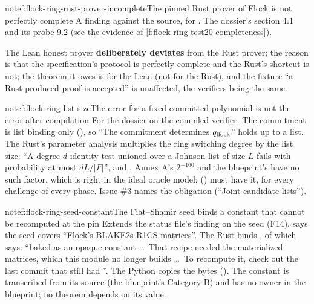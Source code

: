 \begin{finding}{note}{f:flock-ring-rust-prover-incomplete}{The pinned Rust prover of Flock is not
perfectly complete}
 A finding against the source, for . The dossier's
section 4.1 and its probe 9.2 (see the evidence of \cref{f:flock-ring-test20-completeness}).

 The Lean honest prover \textbf{deliberately deviates} from the Rust prover;
the reason is that the specification's protocol is perfectly complete and the Rust's shortcut is
not; the theorem it owes is  for the Lean  (not for the
Rust), and the fixture \enquote{a Rust-produced proof is accepted} is unaffected, the verifiers
being the same.
\end{finding}

\begin{finding}{note}{f:flock-ring-list-size}{The error for a fixed committed polynomial is not
the error after compilation}
 For the dossier on the compiled verifier. The commitment is list binding only
(), so  \enquote{The commitment
determines $q_{\mathrm{flock}}$} holds up to a list. The Rust's parameter analysis multiplies the ring
switching degree by the list size:  \enquote{A degree-$d$ identity
test unioned over a Johnson list of size $L$ fails with probability at most $dL/|F|$}, and
. Annex A's $2^{-160}$ and the blueprint's  have no such factor,
which is right in the ideal oracle model;  () must have it, for
every challenge of every phase. Issue \#3 names the obligation (\enquote{Joint candidate lists}).
\end{finding}

\begin{finding}{note}{f:flock-ring-seed-constant}{The Fiat--Shamir seed binds a constant that
cannot be recomputed at the pin}
 Extends the status file's finding on the seed (F14).  says the seed
covers \enquote{Flock's BLAKE2s R1CS matrices}. The Rust binds , of which
 says: \enquote{baked as an opaque constant \dots\ That recipe needed the
materialized matrices, which this module no longer builds \dots\ To recompute it, check out the
last commit that still had }. The Python copies the bytes
(). The constant is transcribed from its source (the blueprint's Category B)
and has no owner in the blueprint; no theorem depends on its value.
\end{finding}

